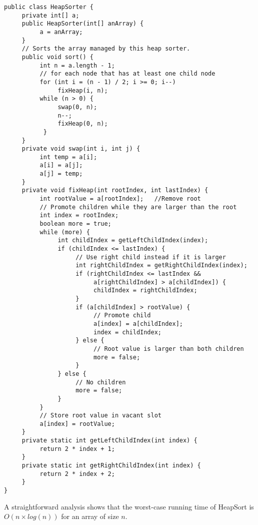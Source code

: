 \begin{lstlisting}
public class HeapSorter {
     private int[] a;
     public HeapSorter(int[] anArray) {
          a = anArray;
     }   
     // Sorts the array managed by this heap sorter.
     public void sort() {
          int n = a.length - 1;
          // for each node that has at least one child node
          for (int i = (n - 1) / 2; i >= 0; i--)
               fixHeap(i, n);
          while (n > 0) {
               swap(0, n);
               n--;
               fixHeap(0, n);
           }
     }
     private void swap(int i, int j) {
          int temp = a[i];
          a[i] = a[j];
          a[j] = temp;
     }
     private void fixHeap(int rootIndex, int lastIndex) {
          int rootValue = a[rootIndex];   //Remove root
          // Promote children while they are larger than the root
          int index = rootIndex;
          boolean more = true;
          while (more) {
               int childIndex = getLeftChildIndex(index);
               if (childIndex <= lastIndex) {
                    // Use right child instead if it is larger
                    int rightChildIndex = getRightChildIndex(index);
                    if (rightChildIndex <= lastIndex &&
                         a[rightChildIndex] > a[childIndex]) {
                         childIndex = rightChildIndex;
                    }
                    if (a[childIndex] > rootValue) {
                         // Promote child
                         a[index] = a[childIndex];
                         index = childIndex;
                    } else {
                         // Root value is larger than both children
                         more = false;
                    }
               } else {
                    // No children
                    more = false; 
               }
          }
          // Store root value in vacant slot
          a[index] = rootValue;
     }
     private static int getLeftChildIndex(int index) {
          return 2 * index + 1;
     }
     private static int getRightChildIndex(int index) {
          return 2 * index + 2;
     }
}
\end{lstlisting}
A straightforward analysis shows that the worst-case running time of HeapSort is $O(n \times log(n))$ for an array of size $n$.